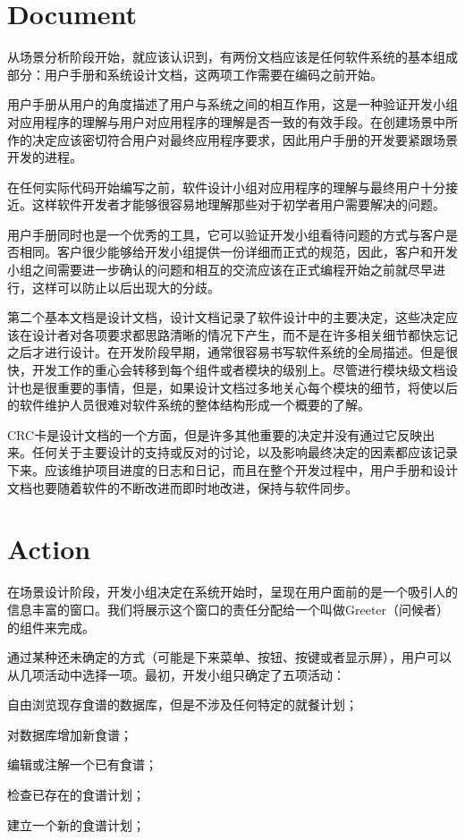 \section{Document}

从场景分析阶段开始，就应该认识到，有两份文档应该是任何软件系统的基本组成部分：用户手册和系统设计文档，这两项工作需要在编码之前开始。

用户手册从用户的角度描述了用户与系统之间的相互作用，这是一种验证开发小组对应用程序的理解与用户对应用程序的理解是否一致的有效手段。在创建场景中所作的决定应该密切符合用户对最终应用程序要求，因此用户手册的开发要紧跟场景开发的进程。

在任何实际代码开始编写之前，软件设计小组对应用程序的理解与最终用户十分接近。这样软件开发者才能够很容易地理解那些对于初学者用户需要解决的问题。

用户手册同时也是一个优秀的工具，它可以验证开发小组看待问题的方式与客户是否相同。客户很少能够给开发小组提供一份详细而正式的规范，因此，客户和开发小组之间需要进一步确认的问题和相互的交流应该在正式编程开始之前就尽早进行，这样可以防止以后出现大的分歧。

第二个基本文档是设计文档，设计文档记录了软件设计中的主要决定，这些决定应该在设计者对各项要求都思路清晰的情况下产生，而不是在许多相关细节都快忘记之后才进行设计。在开发阶段早期，通常很容易书写软件系统的全局描述。但是很快，开发工作的重心会转移到每个组件或者模块的级别上。尽管进行模块级文档设计也是很重要的事情，但是，如果设计文档过多地关心每个模块的细节，将使以后的软件维护人员很难对软件系统的整体结构形成一个概要的了解。

CRC卡是设计文档的一个方面，但是许多其他重要的决定并没有通过它反映出来。任何关于主要设计的支持或反对的讨论，以及影响最终决定的因素都应该记录下来。应该维护项目进度的日志和日记，而且在整个开发过程中，用户手册和设计文档也要随着软件的不断改进而即时地改进，保持与软件同步。

\section{Action}


在场景设计阶段，开发小组决定在系统开始时，呈现在用户面前的是一个吸引人的信息丰富的窗口。我们将展示这个窗口的责任分配给一个叫做Greeter（问候者）的组件来完成。

通过某种还未确定的方式（可能是下来菜单、按钮、按键或者显示屏），用户可以从几项活动中选择一项。最初，开发小组只确定了五项活动：

\begin{compactitem}
\item 自由浏览现存食谱的数据库，但是不涉及任何特定的就餐计划；
\item 对数据库增加新食谱；
\item 编辑或注解一个已有食谱；
\item 检查已存在的食谱计划；
\item 建立一个新的食谱计划；
\end{compactitem}

